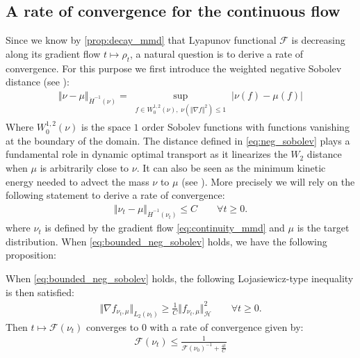 
\subsection{A rate of convergence for the continuous flow}\label{sec:Lojasiewicz_inequality}

Since we know by \cref{prop:decay_mmd} that Lyapunov functional $\mathcal{F}$ is decreasing along its gradient flow $t\mapsto \rho_t$, a natural question is to derive a rate of convergence.
For this purpose we first introduce the weighted negative Sobolev distance (see \cite{peyre2019computational}):%
\begin{align}\label{eq:neg_sobolev}
	\Vert \nu - \mu \Vert_{\dot{H}^{-1}(\nu)} = \sup_{\substack{ f\in W_0^{1,2}(\nu), \; \nu(\Vert \nabla f \Vert^2) \leq 1 }} \vert \nu(f)-\mu(f)\vert 
\end{align}
Where $W_0^{1,2}(\nu)$ is the space $1$ order Sobolev functions with functions vanishing at the boundary of the domain.
The distance defined in \cref{eq:neg_sobolev} plays a fundamental role in dynamic optimal transport as it linearizes the $W_2$ distance when $\mu$ is arbitrarily close to $\nu$. It can also be seen as the minimum kinetic energy needed to advect the mass $\nu$ to $\mu$ (see \cite{mroueh2018regularized}). More precisely we will rely on the following statement to derive a rate of convergence:
\begin{align}\label{eq:bounded_neg_sobolev}
	\Vert \nu_t  - \mu \Vert_{\dot{H}^{-1}(\nu_t)} \leq C \qquad \forall t\geq 0.
\end{align} 
where $\nu_t$ is defined by the gradient flow \eqref{eq:continuity_mmd} and $\mu$ is the target distribution. When \cref{eq:bounded_neg_sobolev}  holds, we have the following proposition:
\begin{proposition}\label{prop:lojasiewicz}
	When \cref{eq:bounded_neg_sobolev} holds, the following Lojasiewicz-type inequality is then satisfied:%
	\begin{align}\label{eq:PL_type_inequality}
		\Vert \nabla f_{\nu_t,\mu} \Vert_{L_2(\nu_t)} \geq \frac{1}{C} \Vert f_{\nu_t,\mu} \Vert^2_{\mathcal{H}} \qquad \forall t\geq 0.
	\end{align}
	Then $t\mapsto \mathcal{F}(\nu_t)$ converges to $0$ with a rate of convergence given by:
	\begin{align}
	\mathcal{F}(\nu_t)\leq \frac{1}{\mathcal{F}(\nu_0)^{-1} + \frac{4t}{C}}
	\end{align}
\end{proposition}

